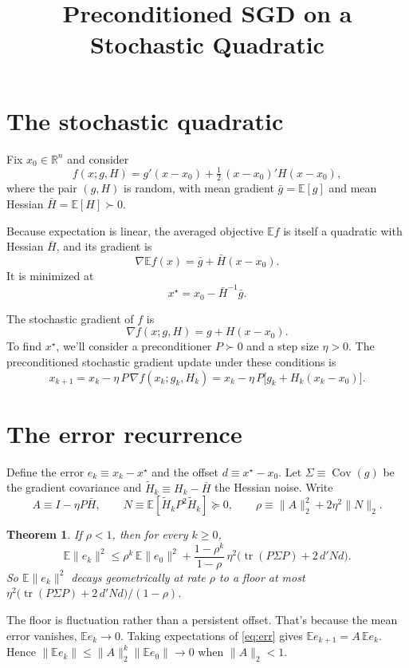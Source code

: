 \documentclass[11pt]{article}
\title{Preconditioned SGD on a Stochastic Quadratic}
\author{}
\date{}
\newcommand{\Hbar}{\bar{H}}
\newcommand{\gbar}{\bar{g}}
\newcommand{\E}{\mathbb{E}}
\newcommand{\tr}{\operatorname{tr}}
\newcommand{\R}{\mathbb{R}}
\newtheorem{theorem}{Theorem}
\begin{document}
\maketitle

\section{The stochastic quadratic}

Fix $x_0\in\R^n$ and consider
\[
    f(x;g,H)=g'(x-x_0)+\tfrac12\,(x-x_0)'H(x-x_0),
\]
where the pair $(g,H)$ is random, with mean gradient $\gbar=\E[g]$ and mean
Hessian $\Hbar=\E[H]\succ0$.

Because expectation is linear, the averaged
objective $\E f$ is itself a quadratic with Hessian $\Hbar$, and its gradient is
\[
    \nabla \E f(x)=\gbar+\Hbar(x-x_0).
\]
It is
minimized at
\[
    x^\star=x_0-\Hbar^{-1}\gbar .
\]

The  stochastic gradient of $f$ is
\[
    \nabla f(x;g,H)=g+H(x-x_0).
\]
To find $x^\star$, we'll consider a preconditioner $P\succ0$ and a step size
$\eta>0$. The preconditioned stochastic gradient update under these conditions
is
\[
    x_{k+1}=x_k-\eta\,P\,\nabla f(x_k;g_k,H_k)
    =x_k-\eta\,P\big[g_k+H_k(x_k-x_0)\big].
\]

\section{The error recurrence}

Define the error $e_k\equiv x_k-x^\star$ and the offset
$d\equiv x^\star-x_0$. Let
$\Sigma\equiv\operatorname{Cov}(g)$ be the gradient covariance and
$\tilde{H}_k\equiv H_k-\Hbar$ the Hessian noise. Write
\[
    A\equiv I-\eta P\Hbar,\qquad N\equiv\E[\tilde{H}_k P^2\tilde{H}_k]\succeq0,
    \qquad \rho\equiv\|A\|_2^2+2\eta^2\|N\|_2 .
\]

\begin{theorem}\label{thm:mse}
    If $\rho<1$, then for every $k\ge0$,
    \[
        \E\|e_k\|^2\le\rho^k\,\E\|e_0\|^2
        +\frac{1-\rho^k}{1-\rho}\,\eta^2\big(\tr(P\Sigma P)+2\,d'Nd\big).
    \]
    So $\E\|e_k\|^2$ decays geometrically at rate $\rho$ to a floor at most
    $\eta^2\big(\tr(P\Sigma P)+2\,d'Nd\big)/(1-\rho)$.
\end{theorem}

The floor is fluctuation rather than a persistent offset. That's because the
mean error vanishes, $\E e_k\to0$.
Taking expectations of \eqref{eq:err} gives $\E e_{k+1}=A\,\E e_k$.
Hence $\|\E e_k\|\le\|A\|_2^k\|\E e_0\|\to0$ when $\|A\|_2<1$.
\end{document}
